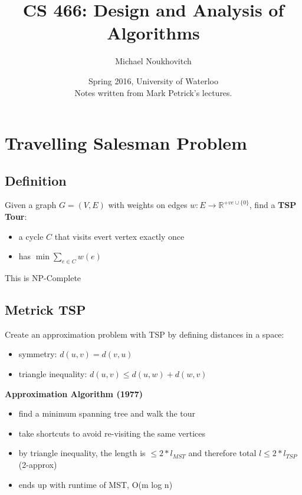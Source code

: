 \documentclass[]{article}
\theoremstyle{definition}
\begin{document}
	\let\ref\Cref

	\title{\bf{CS 466: Design and Analysis of Algorithms}}
	\date{Spring 2016, University of Waterloo \\ \center Notes written from Mark Petrick's lectures.}
	\author{Michael Noukhovitch}

	\maketitle
	\newpage
	\tableofcontents
	\newpage

	\section{Travelling Salesman Problem}
	\subsection{Definition}
	Given a graph $G = (V,E)$ with weights on edges $w: E \rightarrow \mathbb{R}^{+ve \cup \{0\}}$, find a \textbf{TSP Tour}:
	\begin{itemize}
		\item a cycle $C$ that visits evert vertex exactly once
		\item has $\min \sum_{e \in C} w(e)$
	\end{itemize}
	This is NP-Complete

	\subsection{Metrick TSP}
	Create an approximation problem with TSP by defining distances in a space:
	\begin{itemize}
		\item symmetry: $d(u,v) = d(v,u)$
		\item triangle inequality: $d(u,v) \le d(u,w) + d(w,v)$
	\end{itemize}
	\textbf{Approximation Algorithm (1977)}
	\begin{itemize}
		\item find a minimum spanning tree and walk the tour
		\item take shortcuts to avoid re-visiting the same vertices
		\item by triangle inequality, the length is $\le 2* l_{MST}$ and therefore total $l \le 2*l_{TSP}$ (2-approx)
		\item ends up with runtime of MST, O(m log n)
	\end{itemize}
\end{document}
